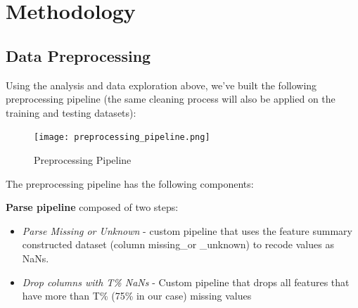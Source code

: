 \section{Methodology}

\subsection{Data Preprocessing}

Using the analysis and data exploration above, we've built the following preprocessing pipeline (the same cleaning process will also be applied on the training and testing datasets):

\begin{figure}[h]
\centering
\texttt{[image: preprocessing\_pipeline.png]}
\caption{Preprocessing Pipeline}
\label{fig:preprocessing_pipeline}
\end{figure}

The preprocessing pipeline has the following components:

\textbf{Parse pipeline} composed of two steps:
\begin{itemize}
    \item \emph{Parse Missing or Unknown} - custom pipeline that uses the feature summary constructed dataset (column missing\_or \_unknown) to recode values as NaNs.
    \item \emph{Drop columns with T\% NaNs} - Custom pipeline that drops all features that have more than T\% (75\% in our case) missing values
\end{itemize}

